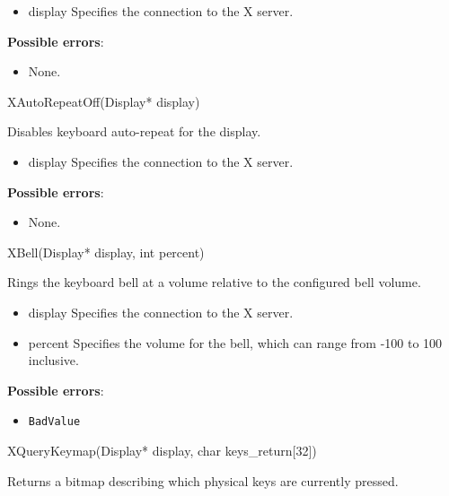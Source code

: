 \documentclass{report}
\begin{document}
\begin{itemize}
        \begin{itemize}
            \item display Specifies the connection to the X server.
        \end{itemize}

        \textbf{Possible errors}:
        \begin{itemize}
            \item None.
        \end{itemize}

        \begin{cppcode}
            XAutoRepeatOff(Display* display)
        \end{cppcode}
        \bigbreak \noindent
        Disables keyboard auto-repeat for the display.

        \begin{itemize}
            \item display Specifies the connection to the X server.
        \end{itemize}

        \textbf{Possible errors}:
        \begin{itemize}
            \item None.
        \end{itemize}

        \begin{cppcode}
        XBell(Display* display, int percent)
        \end{cppcode}
        \bigbreak \noindent
        Rings the keyboard bell at a volume relative to the configured bell volume.

        \begin{itemize}
            \item display Specifies the connection to the X server.
            \item percent Specifies the volume for the bell, which can range from -100 to 100 inclusive.
        \end{itemize}

        \textbf{Possible errors}:
        \begin{itemize}
            \item \texttt{BadValue}
        \end{itemize}

        \begin{cppcode}
            XQueryKeymap(Display* display, char keys_return[32])
        \end{cppcode}
        \bigbreak \noindent
        Returns a bitmap describing which physical keys are currently pressed.


\end{itemize}
\end{document}
